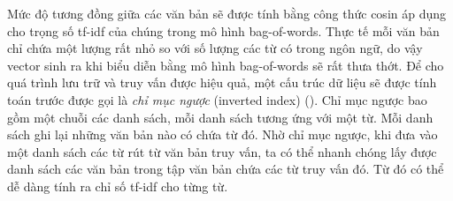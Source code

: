 Mức độ tương đồng giữa các văn bản sẽ được tính bằng công thức cosin áp dụng cho trọng số tf-idf của chúng trong mô hình bag-of-words. Thực tế mỗi văn bản chỉ chứa một lượng rất nhỏ so với số lượng các từ có trong ngôn ngữ, do vậy vector sinh ra khi biểu diễn bằng mô hình bag-of-words sẽ rất thưa thớt. Để cho quá trình lưu trữ và truy vấn được hiệu quả, một cấu trúc dữ liệu sẽ được tính toán trước được gọi là \textit{chỉ mục ngược} (inverted index) (\cite{manning2008introduction}). Chỉ mục ngược bao gồm một chuỗi các danh sách, mỗi danh sách tương ứng với một từ. Mỗi danh sách ghi lại những văn bản nào có chứa từ đó. Nhờ chỉ mục ngược, khi đưa vào một danh sách các từ rút từ văn bản truy vấn, ta có thể nhanh chóng lấy được danh sách các văn bản trong tập văn bản chứa các từ truy vấn đó. Từ đó có thể dễ dàng tính ra chỉ số tf-idf cho từng từ.

